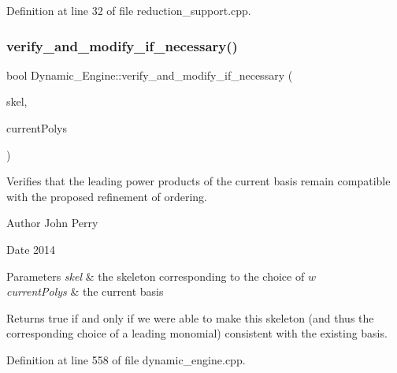 Definition at line 32 of file reduction\+\_\+support.\+cpp.

\mbox{\label{group___g_b_computation_gaf3c21c23093fae5467dd770f790540f6}} 
\subsubsection{\texorpdfstring{verify\+\_\+and\+\_\+modify\+\_\+if\+\_\+necessary()}{verify\_and\_modify\_if\_necessary()}}
{\footnotesize\ttfamily bool Dynamic\+\_\+\+Engine\+::verify\+\_\+and\+\_\+modify\+\_\+if\+\_\+necessary (\begin{DoxyParamCaption}\item[{\hyperlink{group___c_l_s_solvers_class_l_p___solvers_1_1_l_p___solver}{L\+P\+\_\+\+Solver} $\ast$}]{skel,  }\item[{const list$<$ \hyperlink{group__polygroup_class_abstract___polynomial}{Abstract\+\_\+\+Polynomial} $\ast$ $>$ \&}]{current\+Polys }\end{DoxyParamCaption})}



Verifies that the leading power products of the current basis remain compatible with the proposed refinement of ordering. 

\begin{DoxyAuthor}{Author}
John Perry 
\end{DoxyAuthor}
\begin{DoxyDate}{Date}
2014 
\end{DoxyDate}

\begin{DoxyParams}{Parameters}
{\em skel} & the skeleton corresponding to the choice of $w$ \\
\hline
{\em current\+Polys} & the current basis \\
\hline
\end{DoxyParams}
\begin{DoxyReturn}{Returns}
{\ttfamily true} if and only if we were able to make this skeleton (and thus the corresponding choice of a leading monomial) consistent with the existing basis. 
\end{DoxyReturn}


Definition at line 558 of file dynamic\+\_\+engine.\+cpp.

